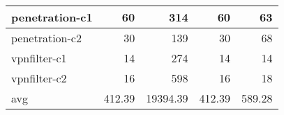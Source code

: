 \begin{table}[]
{\begin{tabular}{|l|r|r|r|r|}
            penetration-c1 & 60                   & 314               & 60             & 63          \\ \hline
            penetration-c2 & 30                   & 139               & 30             & 68          \\ \hline
            vpnfilter-c1      & 14                   & 274               & 14             & 14          \\ \hline
            vpnfilter-c2      & 16                   & 598               & 16             & 18          \\ \hline
            avg & 412.39 & 19394.39 & 412.39 & 589.28 \\ \hline
            \end{tabular}
        }
\end{table}
